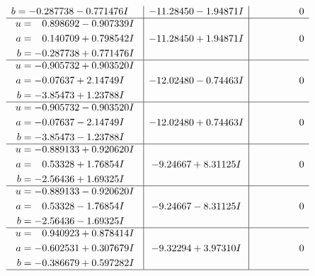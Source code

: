 \documentclass[1p]{elsarticle_modified}
\theoremstyle{definition}
\begin{document}
$$\begin{array}{c|c|c}
\begin{aligned}
b &= -0.287738 - 0.771476 I\end{aligned}
 & -11.28450 - 1.94871 I & \phantom{-0.000000 } 0 \\ \hline\begin{aligned}
u &= \phantom{-}0.898692 - 0.907339 I \\
a &= \phantom{-}0.140709 + 0.798542 I \\
b &= -0.287738 + 0.771476 I\end{aligned}
 & -11.28450 + 1.94871 I & \phantom{-0.000000 } 0 \\ \hline\begin{aligned}
u &= -0.905732 + 0.903520 I \\
a &= -0.07637 + 2.14749 I \\
b &= -3.85473 + 1.23788 I\end{aligned}
 & -12.02480 - 0.74463 I & \phantom{-0.000000 } 0 \\ \hline\begin{aligned}
u &= -0.905732 - 0.903520 I \\
a &= -0.07637 - 2.14749 I \\
b &= -3.85473 - 1.23788 I\end{aligned}
 & -12.02480 + 0.74463 I & \phantom{-0.000000 } 0 \\ \hline\begin{aligned}
u &= -0.889133 + 0.920620 I \\
a &= \phantom{-}0.53328 + 1.76854 I \\
b &= -2.56436 + 1.69325 I\end{aligned}
 & -9.24667 + 8.31125 I & \phantom{-0.000000 } 0 \\ \hline\begin{aligned}
u &= -0.889133 - 0.920620 I \\
a &= \phantom{-}0.53328 - 1.76854 I \\
b &= -2.56436 - 1.69325 I\end{aligned}
 & -9.24667 - 8.31125 I & \phantom{-0.000000 } 0 \\ \hline\begin{aligned}
u &= \phantom{-}0.940923 + 0.878414 I \\
a &= -0.602531 + 0.307679 I \\
b &= -0.386679 + 0.597282 I\end{aligned}
 & -9.32294 + 3.97310 I & \phantom{-0.000000 } 0\\
 \hline 
 \end{array}$$\newpage$$\begin{array}{c|c|c}  

\end{array}$$
\end{document}
